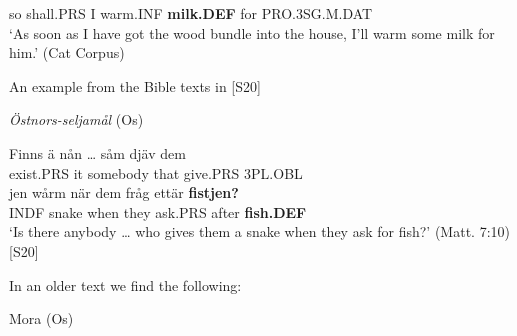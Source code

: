 so  shall.PRS  I  warm.INF  \textbf{milk.DEF} for  PRO.3SG.M.DAT\\

\glt ‘As soon as I have got the wood bundle into the house, I’ll warm some milk for him.’ (Cat Corpus)

\z

An example from the Bible texts in [S20]\textstyleLinguisticExample{:}


\item 

\label{bkm:Ref123968060}\textit{Östnors-seljamål} (Os)



 \ea\label{}
\gll Finns  ä  nån  …  såm  djäv  dem\\


exist.PRS  it  somebody    that  give.PRS  3PL.OBL\\

 \ea\label{}
\gll jen  wårm  när  dem  fråg  ettär  \textbf{fistjen?}\\


INDF  snake  when  they  ask.PRS  after  \textbf{fish.DEF}\\

\glt ‘Is there anybody … who gives them a snake when they ask for fish?’ (Matt. 7:10) [S20]

\z

In an older text we find the following:


\item 

\label{bkm:Ref123968062}Mora (Os)




